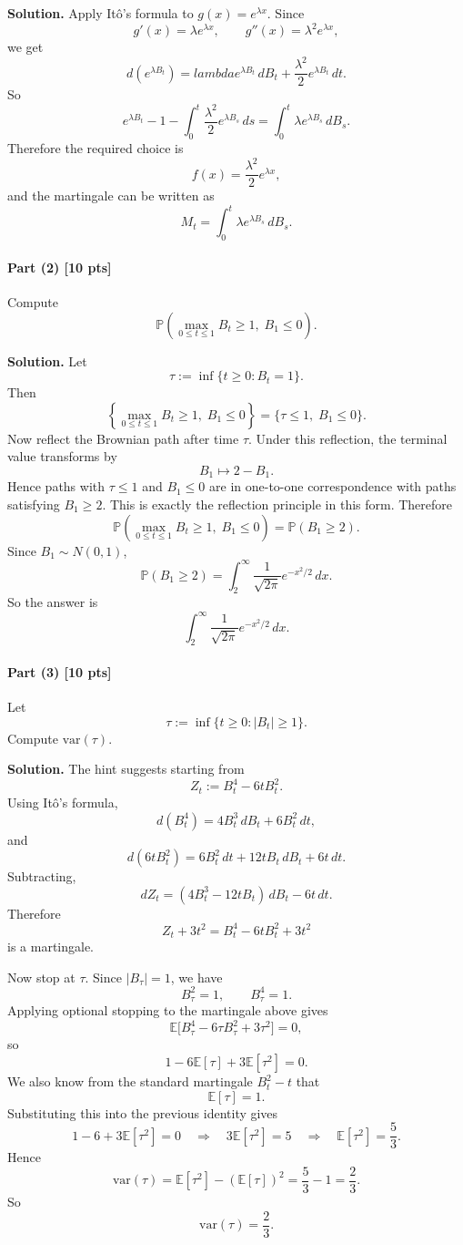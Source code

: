 \documentclass[11pt]{article}
\theoremstyle{definition}
\begin{document}
\textbf{Solution.}
Apply It\^o's formula to \(g(x)=e^{\lambda x}\). Since
\[
g'(x)=\lambda e^{\lambda x},
\qquad
 g''(x)=\lambda^2 e^{\lambda x},
\]
we get
\[
d(e^{\lambda B_t})
=
lambda e^{\lambda B_t}\,dB_t + \frac{\lambda^2}{2}e^{\lambda B_t}\,dt.
\]
So
\[
e^{\lambda B_t}-1-\int_0^t \frac{\lambda^2}{2}e^{\lambda B_s}\,ds
=
\int_0^t \lambda e^{\lambda B_s}\,dB_s.
\]
Therefore the required choice is
\[
f(x)=\frac{\lambda^2}{2}e^{\lambda x},
\]
and the martingale can be written as
\[
M_t=\int_0^t \lambda e^{\lambda B_s}\,dB_s.
\]

\paragraph{Part (2) \hfill [10 pts]}
Compute
\[
\mathbb P\!\left(\max_{0\le t\le 1} B_t\ge 1,\; B_1\le 0\right).
\]

\textbf{Solution.}
Let
\[
\tau:=\inf\{t\ge 0:B_t=1\}.
\]
Then
\[
\left\{\max_{0\le t\le 1}B_t\ge 1,\; B_1\le 0\right\}
=
\{\tau\le 1,\; B_1\le 0\}.
\]
Now reflect the Brownian path after time \(\tau\). Under this reflection, the terminal value transforms by
\[
B_1 \longmapsto 2-B_1.
\]
Hence paths with \(\tau\le 1\) and \(B_1\le 0\) are in one-to-one correspondence with paths satisfying \(B_1\ge 2\). This is exactly the reflection principle in this form. Therefore
\[
\mathbb P\!\left(\max_{0\le t\le 1} B_t\ge 1,\; B_1\le 0\right)
=
\mathbb P(B_1\ge 2).
\]
Since \(B_1\sim N(0,1)\),
\[
\mathbb P(B_1\ge 2)
=
\int_2^{\infty}\frac{1}{\sqrt{2\pi}}e^{-x^2/2}\,dx.
\]
So the answer is
\[
\boxed{\int_2^{\infty}\frac{1}{\sqrt{2\pi}}e^{-x^2/2}\,dx.}
\]

\paragraph{Part (3) \hfill [10 pts]}
Let
\[
\tau:=\inf\{t\ge 0:|B_t|\ge 1\}.
\]
Compute \(\mathrm{var}(\tau)\).

\textbf{Solution.}
The hint suggests starting from
\[
Z_t:=B_t^4-6tB_t^2.
\]
Using It\^o's formula,
\[
d(B_t^4)=4B_t^3\,dB_t+6B_t^2\,dt,
\]
and
\[
d(6tB_t^2)=6B_t^2\,dt+12tB_t\,dB_t+6t\,dt.
\]
Subtracting,
\[
dZ_t=(4B_t^3-12tB_t)\,dB_t-6t\,dt.
\]
Therefore
\[
Z_t+3t^2
=
B_t^4-6tB_t^2+3t^2
\]
is a martingale.

Now stop at \(\tau\). Since \(|B_\tau|=1\), we have
\[
B_\tau^2=1,
\qquad
B_\tau^4=1.
\]
Applying optional stopping to the martingale above gives
\[
\mathbb E\bigl[B_\tau^4-6\tau B_\tau^2+3\tau^2\bigr]=0,
\]
so
\[
1-6\mathbb E[\tau]+3\mathbb E[\tau^2]=0.
\]
We also know from the standard martingale \(B_t^2-t\) that
\[
\mathbb E[\tau]=1.
\]
Substituting this into the previous identity gives
\[
1-6+3\mathbb E[\tau^2]=0
\quad\Longrightarrow\quad
3\mathbb E[\tau^2]=5
\quad\Longrightarrow\quad
\mathbb E[\tau^2]=\frac53.
\]
Hence
\[
\mathrm{var}(\tau)
=
\mathbb E[\tau^2]-(\mathbb E[\tau])^2
=
\frac53-1
=
\frac23.
\]
So
\[
\boxed{\mathrm{var}(\tau)=\frac23.}
\]
\end{document}
